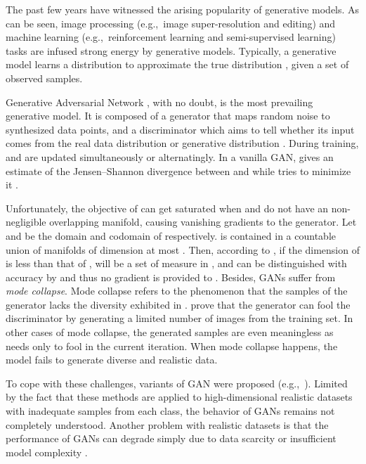 \documentclass[conference]{IEEEtran}
\newcommand{\eg}{{e.g.,~}}
\begin{document}
The past few years have witnessed the arising popularity of generative models. As can be seen, image processing (\eg image super-resolution and editing) and machine learning (\eg reinforcement learning and semi-supervised learning) tasks are infused strong energy by generative models\cite{goodfellow2016nips}. Typically, a generative model learns a distribution  to approximate the true distribution , given a set of observed samples. 







Generative Adversarial Network \cite{GAN}, with no doubt, is the most prevailing generative model. It is composed of a generator  that maps random noise to synthesized data points, and a discriminator  which aims to tell whether its input comes from the real data distribution  or generative distribution . During training,  and  are updated simultaneously or alternatingly. In a vanilla GAN,  gives an estimate of the Jensen--Shannon divergence between  and  while  tries to minimize it \cite{GAN}.

Unfortunately, the objective of  can get saturated when  and  do not have an non-negligible overlapping manifold, causing vanishing gradients to the generator\cite{towardsprincipled}. Let  and  be the domain and codomain of  respectively.  is contained in a countable union of manifolds of dimension at most . Then, according to \cite{towardsprincipled}, if the dimension of  is less than that of ,  will be a set of measure  in ,  and  can be distinguished with accuracy  by  and thus no gradient is provided to .
Besides, GANs suffer from \textit{mode collapse}. Mode collapse refers to the phenomenon that the samples of the generator lacks the diversity exhibited in . \cite{generalization} prove that the generator can fool the discriminator by generating a limited number of images from the training set. In other cases of mode collapse, the generated samples are even meaningless as  needs only to fool  in the current iteration. When mode collapse happens, the model fails to generate diverse and realistic data. 







To cope with these challenges, variants of GAN were proposed (\eg \cite{roth2017stabilizing, lsgan,wgan,improvedwgan,spectralnorm,mescheder2018training}). 
Limited by the fact that these methods are applied to high-dimensional realistic datasets with inadequate samples from each class, the behavior of GANs remains not completely understood. 
Another problem with realistic datasets is that the performance of GANs can degrade simply due to data scarcity or insufficient model complexity \cite{generalization,biggan}. 
\end{document}
